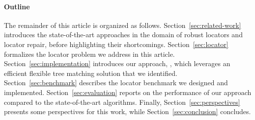 \documentclass[preprint, 12pt]{elsarticle}
\begin{document}
\paragraph{Outline}
The remainder of this article is organized as follows.
Section~\ref{sec:related-work} introduces the state-of-the-art approaches in the domain of robust locators and locator repair, before highlighting their shortcomings.
Section~\ref{sec:locator} formalizes the locator problem we address in this article.
Section~\ref{sec:implementation} introduces our approach, \erratum, which leverages an efficient flexible tree matching solution that we identified.
Section~\ref{sec:benchmark} describes the locator benchmark we designed and implemented.
Section~\ref{sec:evaluation} reports on the performance of our approach compared to the state-of-the-art algorithms.
Finally, Section~\ref{sec:perspectives} presents some perspectives for this work, while Section~\ref{sec:conclusion} concludes.

\end{document}
